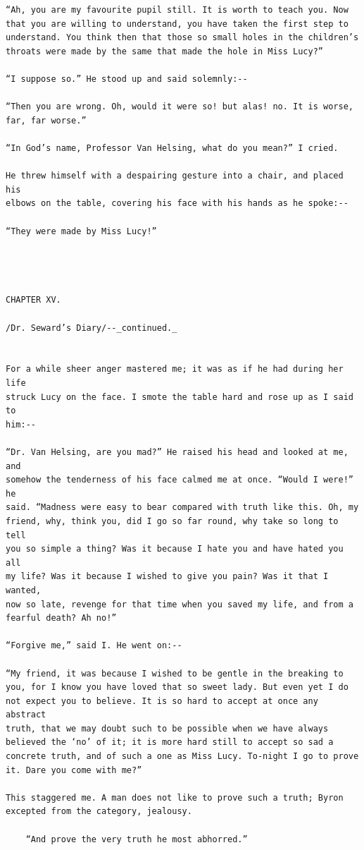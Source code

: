 \documentclass{article}
\begin{document}
\begin{verbatim}
“Ah, you are my favourite pupil still. It is worth to teach you. Now
that you are willing to understand, you have taken the first step to
understand. You think then that those so small holes in the children’s
throats were made by the same that made the hole in Miss Lucy?”

“I suppose so.” He stood up and said solemnly:--

“Then you are wrong. Oh, would it were so! but alas! no. It is worse,
far, far worse.”

“In God’s name, Professor Van Helsing, what do you mean?” I cried.

He threw himself with a despairing gesture into a chair, and placed his
elbows on the table, covering his face with his hands as he spoke:--

“They were made by Miss Lucy!”




CHAPTER XV.

/Dr. Seward’s Diary/--_continued._


For a while sheer anger mastered me; it was as if he had during her life
struck Lucy on the face. I smote the table hard and rose up as I said to
him:--

“Dr. Van Helsing, are you mad?” He raised his head and looked at me, and
somehow the tenderness of his face calmed me at once. “Would I were!” he
said. “Madness were easy to bear compared with truth like this. Oh, my
friend, why, think you, did I go so far round, why take so long to tell
you so simple a thing? Was it because I hate you and have hated you all
my life? Was it because I wished to give you pain? Was it that I wanted,
now so late, revenge for that time when you saved my life, and from a
fearful death? Ah no!”

“Forgive me,” said I. He went on:--

“My friend, it was because I wished to be gentle in the breaking to
you, for I know you have loved that so sweet lady. But even yet I do
not expect you to believe. It is so hard to accept at once any abstract
truth, that we may doubt such to be possible when we have always
believed the ‘no’ of it; it is more hard still to accept so sad a
concrete truth, and of such a one as Miss Lucy. To-night I go to prove
it. Dare you come with me?”

This staggered me. A man does not like to prove such a truth; Byron
excepted from the category, jealousy.

    “And prove the very truth he most abhorred.”


\end{verbatim}
\end{document}
